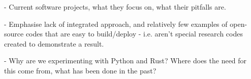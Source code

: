- Current software projects, what they focus on, what their pitfalls are.

- Emphasise lack of integrated approach, and relatively few examples of open-source codes that are easy to build/deploy - i.e. aren't special research codes created to demonstrate a result.

- Why are we experimenting with Python and Rust? Where does the need for this come from, what has been done in the past?

